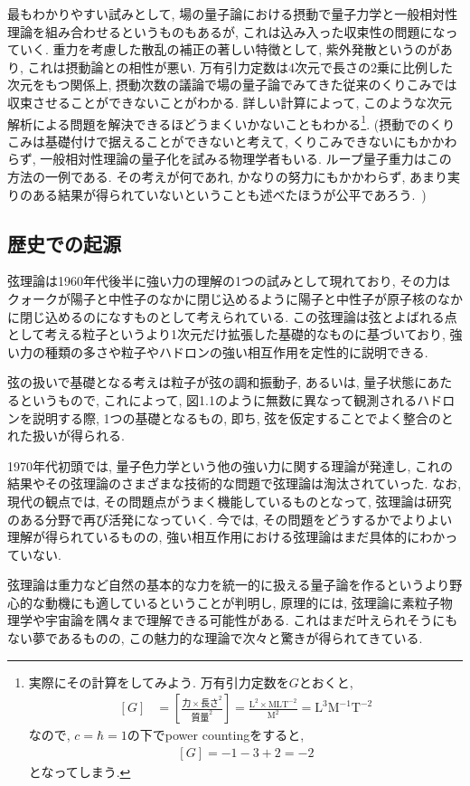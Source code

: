 \documentclass[10pt,a4paper]{jsarticle}
\begin{document}
最もわかりやすい試みとして, 場の量子論における摂動で量子力学と一般相対性理論を組み合わせるというものもあるが, これは込み入った収束性の問題になっていく. 重力を考慮した散乱の補正の著しい特徴として, 紫外発散というのがあり, これは摂動論との相性が悪い. 万有引力定数は4次元で長さの2乗に比例した次元をもつ関係上, 摂動次数の議論で場の量子論でみてきた従来のくりこみでは収束させることができないことがわかる. 詳しい計算によって, このような次元解析による問題を解決できるほどうまくいかないこともわかる\footnote{
    実際にその計算をしてみよう. 万有引力定数を$G$とおくと, 
    \begin{align*}
        \left[ G \right] &= \left[ \frac{\text{力} \times \text{長さ}^2 }{\text{質量}^2 } \right] = \frac{\mathrm{L}^2 \times \mathrm{M} \mathrm{L} \mathrm{T}^{-2} }{\mathrm{M}^2 } = \mathrm{L}^3 \mathrm{M}^{-1} \mathrm{T}^{-2}
    \end{align*}
    なので, $c = \hbar = 1$の下でpower countingをすると, 
    \begin{align*}
        \left[ G \right] = - 1 - 3 + 2 = - 2
    \end{align*}
    となってしまう. 
}. (摂動でのくりこみは基礎付けで据えることができないと考えて, くりこみできないにもかかわらず, 一般相対性理論の量子化を試みる物理学者もいる. ループ量子重力はこの方法の一例である. その考えが何であれ, かなりの努力にもかかわらず, あまり実りのある結果が得られていないということも述べたほうが公平であろう.~)\par
\subsection{歴史での起源}
弦理論は1960年代後半に強い力の理解の1つの試みとして現れており, その力はクォークが陽子と中性子のなかに閉じ込めるように陽子と中性子が原子核のなかに閉じ込めるのになすものとして考えられている. この弦理論は弦とよばれる点として考える粒子というより1次元だけ拡張した基礎的なものに基づいており, 強い力の種類の多さや粒子やハドロンの強い相互作用を定性的に説明できる. \par
弦の扱いで基礎となる考えは粒子が弦の調和振動子, あるいは, 量子状態にあたるというもので, これによって, 図1.1のように無数に異なって観測されるハドロンを説明する際, 1つの基礎となるもの, 即ち, 弦を仮定することでよく整合のとれた扱いが得られる. \par
1970年代初頭では, 量子色力学という他の強い力に関する理論が発達し, これの結果やその弦理論のさまざまな技術的な問題で弦理論は淘汰されていった. なお, 現代の観点では, その問題点がうまく機能しているものとなって, 弦理論は研究のある分野で再び活発になっていく. 今では, その問題をどうするかでよりよい理解が得られているものの, 強い相互作用における弦理論はまだ具体的にわかっていない. \par
弦理論は重力など自然の基本的な力を統一的に扱える量子論を作るというより野心的な動機にも適しているということが判明し, 原理的には, 弦理論に素粒子物理学や宇宙論を隅々まで理解できる可能性がある. これはまだ叶えられそうにもない夢であるものの, この魅力的な理論で次々と驚きが得られてきている. 
\end{document}

